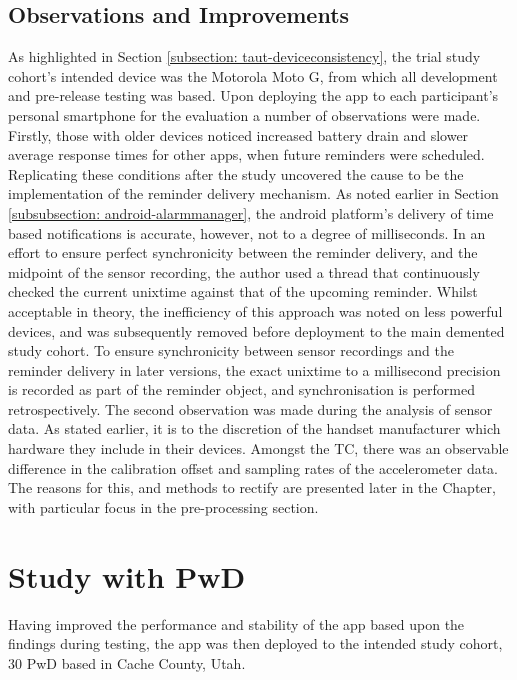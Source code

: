 \subsection{Observations and Improvements} \label{subsection: improvements}
As highlighted in Section \ref{subsection: taut-deviceconsistency}, the trial study cohort's intended device was the Motorola Moto G, from which all development and pre-release testing was based. Upon deploying the app to each participant's personal smartphone for the evaluation a number of observations were made.
Firstly, those with older devices noticed increased battery drain and slower average response times for other apps, when future reminders were scheduled. Replicating these conditions after the study uncovered the cause to be the implementation of the reminder delivery mechanism. As noted earlier in Section \ref{subsubsection: android-alarmmanager}, the android platform's delivery of time based notifications is accurate, however, not to a degree of milliseconds. In an effort to ensure perfect synchronicity between the reminder delivery, and the midpoint of the sensor recording, the author used a thread that continuously checked the current unixtime against that of the upcoming reminder. Whilst acceptable in theory, the inefficiency of this approach was noted on less powerful devices, and was subsequently removed before deployment to the main demented study cohort. To ensure synchronicity between sensor recordings and the reminder delivery in later versions, the exact unixtime to a millisecond precision is recorded as part of the reminder object, and synchronisation is performed retrospectively.
The second observation was made during the analysis of sensor data. As stated earlier, it is to the discretion of the handset manufacturer which hardware they include in their devices. Amongst the TC, there was an observable difference in the calibration offset and sampling rates of the accelerometer data. The reasons for this, and methods to rectify are presented later in the Chapter, with particular focus in the pre-processing section.

\section{Study with PwD}
Having improved the performance and stability of the app based upon the findings during testing, the app was then deployed to the intended study cohort, 30 PwD based in Cache County, Utah.

